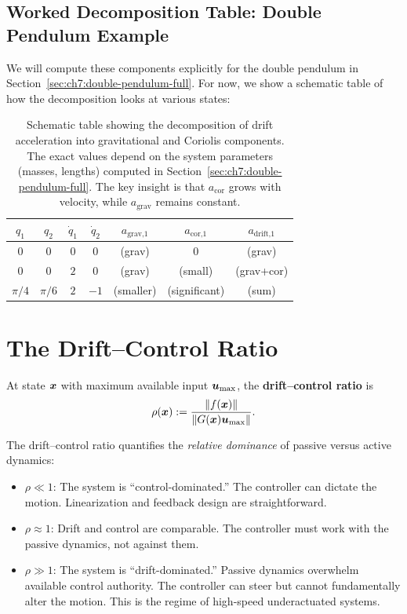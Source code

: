 \subsection{Worked Decomposition Table: Double Pendulum Example}

We will compute these components explicitly for the double pendulum in Section~\ref{sec:ch7:double-pendulum-full}.
For now, we show a schematic table of how the decomposition looks at various states:

\begin{table}[h!]
\centering
\small
\begin{tabular}{|c|c|c|c|c|c|c|}
\hline
$q_1$ & $q_2$ & $\dot{q}_1$ & $\dot{q}_2$ & $a_{\text{grav,1}}$ & $a_{\text{cor,1}}$ & $a_{\text{drift,1}}$ \\
\hline
$0$ & $0$ & $0$ & $0$ & (grav) & $0$ & (grav) \\
$0$ & $0$ & $2$ & $0$ & (grav) & (small) & (grav+cor) \\
$\pi/4$ & $\pi/6$ & $2$ & $-1$ & (smaller) & (significant) & (sum) \\
\hline
\end{tabular}
\caption[Decomposition of drift components for double pendulum.]
{Schematic table showing the decomposition of drift acceleration into gravitational and Coriolis
components. The exact values depend on the system parameters (masses, lengths) computed in
Section~\ref{sec:ch7:double-pendulum-full}. The key insight is that $a_{\text{cor}}$ grows
with velocity, while $a_{\text{grav}}$ remains constant.}
\label{tab:ch7:drift-decomposition}
\end{table}

\section{The Drift--Control Ratio}

\begin{definition}
\label{def:ch7:DCR}
At state $\bm{x}$ with maximum available input $\bm{u}_{\max}$, the \textbf{drift--control
ratio} is
\begin{equation}
\rho(\bm{x}) := \frac{\left\lVert f(\bm{x}) \right\rVert}{\left\lVert G(\bm{x})\bm{u}_{\max} \right\rVert}.
\label{eq:ch7:DCR}
\end{equation}
\end{definition}

The drift--control ratio quantifies the \emph{relative dominance} of passive versus
active dynamics:

\begin{itemize}
\item $\rho \ll 1$: The system is ``control-dominated.'' The controller can dictate
      the motion. Linearization and feedback design are straightforward.
\item $\rho \approx 1$: Drift and control are comparable. The controller must work
      with the passive dynamics, not against them.
\item $\rho \gg 1$: The system is ``drift-dominated.'' Passive dynamics overwhelm
      available control authority. The controller can steer but cannot fundamentally
      alter the motion. This is the regime of high-speed underactuated systems.
\end{itemize}

